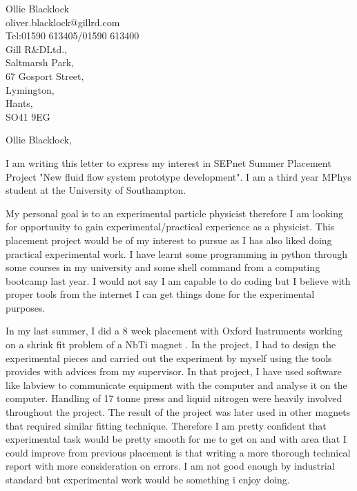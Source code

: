 \documentclass[11pt]{letter} %
\begin{document}

\begin{letter}{Ollie Blacklock\\oliver.blacklock@gillrd.com\\Tel:01590 613405/01590 613400\\Gill R\&DLtd.,\\Saltmarsh Park,\\67 Gosport Street,\\Lymington,\\Hants,\\ SO41 9EG}


\opening{Ollie Blacklock,} 

I am writing this letter to express my interest in SEPnet Summer Placement Project "New fluid flow system prototype development". I am a third year MPhys student at the University of Southampton. 

My personal goal is to an experimental particle physicist therefore I am looking for opportunity to gain experimental/practical experience as a physicist. This placement project would be of my interest to pursue as I has also liked doing practical experimental work. I have learnt some programming in python through some courses in my university and some shell command from a computing bootcamp last year. I would not say I am capable to do coding  but I believe with proper tools from the internet I can get things done for the experimental purposes.

In my last summer, I did a 8 week placement with Oxford Instruments working on a shrink fit problem of a NbTi magnet . In the project, I had to design the experimental pieces and carried out the experiment by myself using the tools provides with advices from my supervisor. In that project, I have used software like labview to communicate equipment with the computer and analyse it on the computer. Handling of 17 tonne press and liquid nitrogen were heavily involved throughout the project. The result of the project was later used in other magnets that required similar fitting technique. Therefore I am pretty confident that experimental task would be pretty smooth for me to get on and with area that I could improve from previous placement is that writing a more thorough technical report with more consideration on errors. I am not good enough by industrial standard but experimental work would be something i enjoy doing.


\end{letter}
\end{document}

